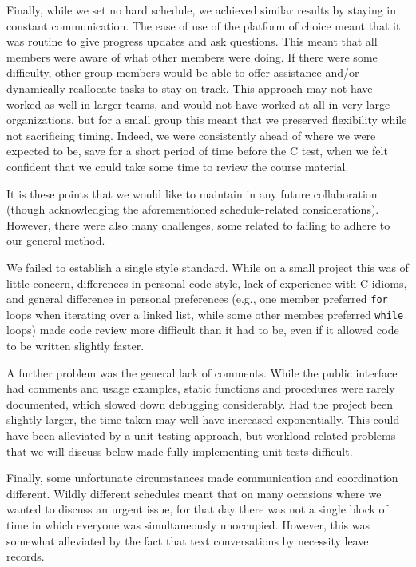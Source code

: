 \documentclass[11pt]{article}
\begin{document}
Finally, while we set no hard schedule, we achieved similar results by staying in constant communication. The ease of use of the platform of choice meant that it was routine to give progress updates and ask questions. This meant that all members were aware of what other members were doing. If there were some difficulty, other group members would be able to offer assistance and/or dynamically reallocate tasks to stay on track. This approach may not have worked as well in larger teams, and would not have worked at all in very large organizations, but for a small group this meant that we preserved flexibility while not sacrificing timing. Indeed, we were consistently ahead of where we were expected to be, save for a short period of time before the C test, when we felt confident that we could take some time to review the course material.

It is these points that we would like to maintain in any future collaboration (though acknowledging the aforementioned schedule-related considerations). However, there were also many challenges, some related to failing to adhere to our general method.

We failed to establish a single style standard. While on a small project this was of little concern, differences in personal code style, lack of experience with C idioms, and general difference in personal preferences (e.g., one member preferred \verb|for| loops when iterating over a linked list, while some other membes preferred \verb|while| loops) made code review more difficult than it had to be, even if it allowed code to be written slightly faster.

A further problem was the general lack of comments. While the public interface had comments and usage examples, static functions and procedures were rarely documented, which slowed down debugging considerably. Had the project been slightly larger, the time taken may well have increased exponentially. This could have been alleviated by a unit-testing approach, but workload related problems that we will discuss below made fully implementing unit tests difficult.

Finally, some unfortunate circumstances made communication and coordination different. Wildly different schedules meant that on many occasions where we wanted to discuss an urgent issue, for that day there was not a single block of time in which everyone was simultaneously unoccupied. However, this was somewhat alleviated by the fact that text conversations by necessity leave records.
\end{document}
